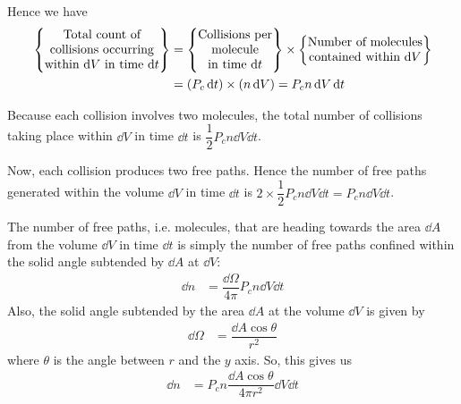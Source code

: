 		Hence we have
		\begin{align*}
			\qty{\begin{matrix}\text{Total count of}\\ \text{collisions occurring}\\ \text{within $\dd{V}$ in time $\dd{t}$}\end{matrix}}&=\qty{\begin{matrix}\text{Collisions per}\\ \text{molecule}\\ \text{in time $\dd{t}$}\end{matrix}}\times\qty{\begin{matrix}\text{Number of molecules}\\ \text{contained within $\dd{V}$}\end{matrix}} \\
				&=\qty(P_c\dd{t})\times\qty(n\dd{V})=P_cn\dd{V}\dd{t}
		\end{align*}
		
		Because each collision involves two molecules, the total number of collisions taking place within $\dd{V}$ in time $\dd{t}$ is $\dfrac{1}{2}P_cn\dd{V}\dd{t}$.
		
		Now, each collision produces two free paths. Hence the number of free paths generated within the volume $\dd{V}$ in time $\dd{t}$ is $2\times\dfrac{1}{2}P_cn\dd{V}\dd{t}=P_cn\dd{V}\dd{t}$.
		
		The number of free paths, i.e. molecules, that are heading towards the area $\dd{A}$ from the volume $\dd{V}$ in time $\dd{t}$ is simply the number of free paths confined within the solid angle subtended by $\dd{A}$ at $\dd{V}$:
		\begin{align*}
			\dd{n}&=\dfrac{\dd{\Omega}}{4\pi}P_cn\dd{V}\dd{t}
		\end{align*}
		Also, the solid angle subtended by the area $\dd{A}$ at the volume $\dd{V}$ is given by
		\begin{align*}
			\dd{\Omega}&=\dfrac{\dd{A}\cos{\theta}}{r^2}
		\end{align*}
		where $\theta$ is the angle between $r$ and the $y$ axis. So, this gives us
		\begin{align*}
			\dd{n}&=P_cn\dfrac{\dd{A}\cos{\theta}}{4\pi r^2}\dd{V}\dd{t}
		\end{align*}
		
